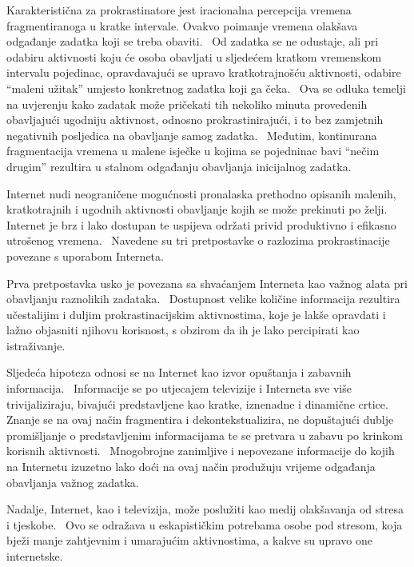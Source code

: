 \documentclass[11pt,twocolumn,english]{article}
\begin{document}
Karakteristična za prokrastinatore jest iracionalna percepcija vremena fragmentiranoga u kratke
intervale. Ovakvo poimanje vremena olakšava odgađanje zadatka koji se treba obaviti.~ Od zadatka se
ne odustaje, ali pri odabiru aktivnosti koju će osoba obavljati u sljedećem kratkom
vremenskom intervalu pojedinac, opravdavajući se upravo kratkotrajnošću aktivnosti, odabire ``maleni užitak''
umjesto konkretnog zadatka koji ga čeka.~ Ova se odluka temelji na uvjerenju kako zadatak može pričekati
tih nekoliko minuta provedenih obavljajući ugodniju aktivnost, odnosno prokrastinirajući, i to bez
zamjetnih negativnih posljedica na obavljanje samog zadatka.~ Međutim, kontinurana fragmentacija vremena
u malene isječke u kojima se pojedninac bavi ``nečim drugim'' rezultira u stalnom odgađanju obavljanja
inicijalnog zadatka.~ \cite{Online08thatchera}

Internet nudi neograničene mogućnosti pronalaska prethodno opisanih malenih, kratkotrajnih i ugodnih 
aktivnosti obavljanje kojih se može prekinuti po želji.~ Internet je brz i lako dostupan te uspijeva održati 
privid produktivno i efikasno utrošenog vremena.~ Navedene su tri pretpostavke o razlozima prokrastinacije
povezane s uporabom Interneta. 

Prva pretpostavka usko je povezana sa shvaćanjem Interneta kao važnog alata pri obavljanju raznolikih 
zadataka.~ Dostupnost velike količine informacija rezultira učestalijim i duljim prokrastinacijskim 
aktivnostima, koje je lakše opravdati i lažno objasniti njihovu korisnost, s obzirom da ih je 
lako percipirati kao istraživanje. \cite{Lavoie01cyberslacking}

Sljedeća hipoteza odnosi se na Internet kao izvor opuštanja i zabavnih informacija.~ Informacije se po utjecajem 
televizije i Interneta sve više trivijaliziraju, bivajući predstavljene kao kratke, iznenadne i 
dinamične crtice.~ Znanje se na ovaj način fragmentira i dekontekstualizira, ne dopuštajući 
dublje promišljanje o predstavljenim informacijama te se pretvara u zabavu po krinkom korisnih aktivnosti.~ 
Mnogobrojne zanimljive i nepovezane informacije do kojih na Internetu izuzetno lako doći na ovaj način 
produžuju vrijeme odgađanja obavljanja važnog zadatka. \cite{Postman85amusing}

Nadalje, Internet, kao i televizija, može poslužiti kao medij olakšavanja od stresa i tjeskobe.~ 
Ovo se odražava u eskapističkim potrebama osobe pod stresom, koja bježi manje zahtjevnim i umarajućim 
aktivnostima, a kakve su upravo one internetske. \cite{Lavoie01cyberslacking}
\end{document}
